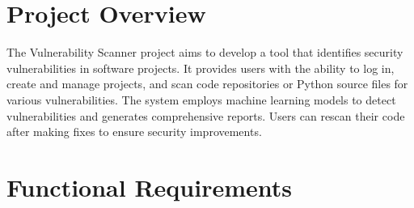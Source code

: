 
\section*{Project Overview}
The Vulnerability Scanner project aims to develop a tool that identifies security vulnerabilities in software projects. It provides users with the ability to log in, create and manage projects, and scan code repositories or Python source files for various vulnerabilities. The system employs machine learning models to detect vulnerabilities and generates comprehensive reports. Users can rescan their code after making fixes to ensure security improvements.

\section*{Functional Requirements}
